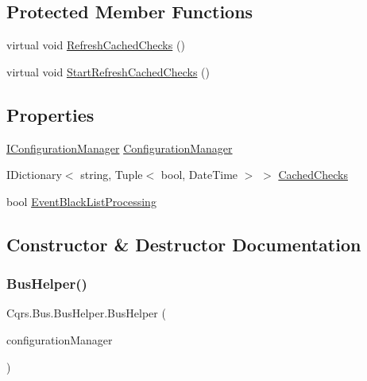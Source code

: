 \subsection*{Protected Member Functions}
\begin{DoxyCompactItemize}
\item 
virtual void \hyperlink{classCqrs_1_1Bus_1_1BusHelper_ad589391a51cd61673d2403ee8012e713}{Refresh\+Cached\+Checks} ()
\item 
virtual void \hyperlink{classCqrs_1_1Bus_1_1BusHelper_a23bfab1be70af651cc48033fcdf4ce2c}{Start\+Refresh\+Cached\+Checks} ()
\end{DoxyCompactItemize}
\subsection*{Properties}
\begin{DoxyCompactItemize}
\item 
\hyperlink{interfaceCqrs_1_1Configuration_1_1IConfigurationManager}{I\+Configuration\+Manager} \hyperlink{classCqrs_1_1Bus_1_1BusHelper_aff0eaa0679d808e268ab4b5fb669bac8}{Configuration\+Manager}
\item 
I\+Dictionary$<$ string, Tuple$<$ bool, Date\+Time $>$ $>$ \hyperlink{classCqrs_1_1Bus_1_1BusHelper_ae29e80bd315b6284509c9fd0b977d2a0}{Cached\+Checks}
\item 
bool \hyperlink{classCqrs_1_1Bus_1_1BusHelper_ae8d3525369ee9572de06f935cc09510b}{Event\+Black\+List\+Processing}
\end{DoxyCompactItemize}


\subsection{Constructor \& Destructor Documentation}
\mbox{\label{classCqrs_1_1Bus_1_1BusHelper_a7799db8bc78bdd9ec25be5bd301d0b8a}} 
\subsubsection{\texorpdfstring{Bus\+Helper()}{BusHelper()}}
{\footnotesize\ttfamily Cqrs.\+Bus.\+Bus\+Helper.\+Bus\+Helper (\begin{DoxyParamCaption}\item[{\hyperlink{interfaceCqrs_1_1Configuration_1_1IConfigurationManager}{I\+Configuration\+Manager}}]{configuration\+Manager }\end{DoxyParamCaption})}



